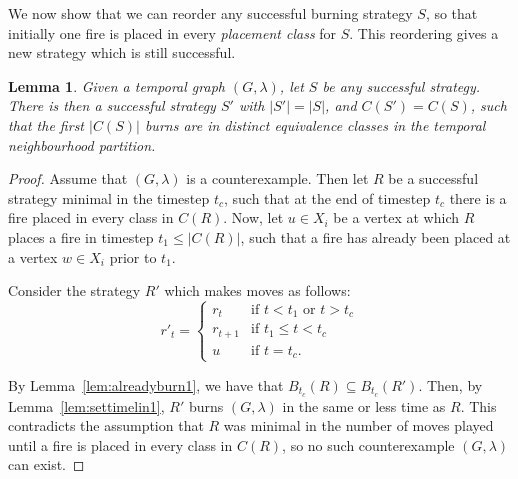 \documentclass[preprint,12pt]{elsarticle}
\newtheorem{lemma}{Lemma}
\begin{document}
We now show that we can reorder any successful burning strategy $S$, so that initially one fire is placed in every \textit{placement class} for $S$. This reordering gives a new strategy which is still successful.

\begin{lemma}
\label{lem:ddfirst1}
Given a temporal graph $(G, \lambda)$, let $S$ be any successful strategy. There is then a successful strategy $S'$ with $|S'| = |S|$, and $C(S') = C(S)$, such that the first $|C(S)|$ burns are in distinct equivalence classes in the temporal neighbourhood partition.
\end{lemma}
\begin{proof}
    Assume that $(G, \lambda)$ is a counterexample. Then let $R$ be a successful strategy minimal in the timestep $t_c$, such that at the end of timestep $t_c$ there is a fire placed in every class in $C(R)$.  Now, let $u \in X_i$ be a vertex at which $R$ places a fire in timestep $t_1 \leq |C(R)|$, such that a fire has already been placed at a vertex $w \in X_i$ prior to $t_1$. 

    Consider the strategy $R'$ which makes moves as follows:
    \[r'_t=\begin{cases}
        r_t &\text{if }t<t_1\text{ or }t>t_c\\
        r_{t+1} &\text{if } t_1 \leq t < t_c\\
        u &\text{if }t=t_c.
    \end{cases}\]

    By Lemma~\ref{lem:alreadyburn1}, we have that $B_{t_c}(R) \subseteq B_{t_c}(R')$. Then, by Lemma~\ref{lem:settimelin1}, $R'$ burns $(G, \lambda)$ in the same or less time as $R$. This contradicts the assumption that $R$ was minimal in the number of moves played until a fire is placed in every class in $C(R)$, so no such counterexample $(G, \lambda)$ can exist.
\end{proof}
\end{document}

